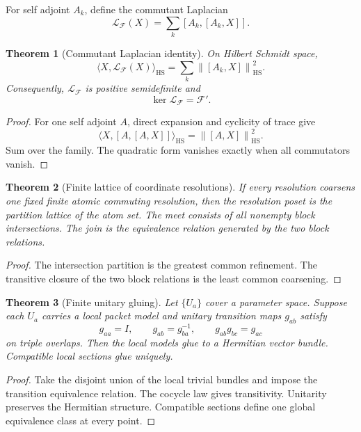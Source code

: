 \documentclass{aomart}
\newtheorem{theorem}{Theorem}[section]
\theoremstyle{definition}
\theoremstyle{remark}
\newcommand{\Fcal}{\mathcal F}
\newcommand{\Lcal}{\mathcal L}
\newcommand{\norm}[1]{\left\lVert#1\right\rVert}
\begin{document}
For self adjoint \(A_k\), define the commutant Laplacian
\[
 \Lcal_{\Fcal}(X)
 =
 \sum_k[A_k,[A_k,X]].
\]

\begin{theorem}[Commutant Laplacian identity]\label{thm:commutant_laplacian}
On Hilbert Schmidt space,
\[
 \boxed{
 \langle X,\Lcal_{\Fcal}(X)\rangle_{\mathrm{HS}}
 =
 \sum_k\norm{[A_k,X]}_{\mathrm{HS}}^2.
 }
\]
Consequently, \(\Lcal_{\Fcal}\) is positive semidefinite and
\[
 \ker\Lcal_{\Fcal}=\Fcal'.
\]
\end{theorem}

\begin{proof}
For one self adjoint \(A\), direct expansion and cyclicity of trace give
\[
 \langle X,[A,[A,X]]\rangle_{\mathrm{HS}}
 =
 \norm{[A,X]}_{\mathrm{HS}}^2.
\]
Sum over the family. The quadratic form vanishes exactly when all commutators vanish.
\end{proof}

\begin{theorem}[Finite lattice of coordinate resolutions]\label{thm:partition_lattice}
If every resolution coarsens one fixed finite atomic commuting resolution, then the resolution poset is the partition lattice of the atom set. The meet consists of all nonempty block intersections. The join is the equivalence relation generated by the two block relations.
\end{theorem}

\begin{proof}
The intersection partition is the greatest common refinement. The transitive closure of the two block relations is the least common coarsening.
\end{proof}

\begin{theorem}[Finite unitary gluing]\label{thm:unitary_gluing}
Let \(\{U_a\}\) cover a parameter space. Suppose each \(U_a\) carries a local packet model and unitary transition maps \(g_{ab}\) satisfy
\[
 g_{aa}=I,
 \qquad
 g_{ab}=g_{ba}^{-1},
 \qquad
 g_{ab}g_{bc}=g_{ac}
\]
on triple overlaps. Then the local models glue to a Hermitian vector bundle. Compatible local sections glue uniquely.
\end{theorem}

\begin{proof}
Take the disjoint union of the local trivial bundles and impose the transition equivalence relation. The cocycle law gives transitivity. Unitarity preserves the Hermitian structure. Compatible sections define one global equivalence class at every point.
\end{proof}
\end{document}
